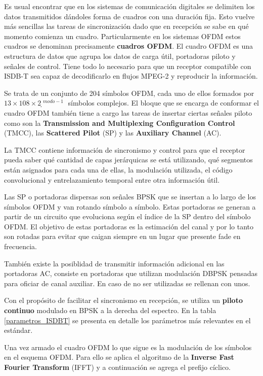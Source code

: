 \documentclass[journal,comsoc]{IEEEtran}
\begin{document}
Es usual encontrar que en los sistemas de comunicación digitales se delimiten los datos transmitidos dándoles forma de cuadros con una duración fija. Esto vuelve más sencillas las tareas de sincronización dado que en recepción se sabe en qué momento comienza un cuadro. Particularmente en los sistemas OFDM estos cuadros se denominan precisamente \textbf{cuadros OFDM}. El cuadro OFDM es una estructura de datos que agrupa los datos de carga útil, portadoras piloto y señales de control. Tiene todo lo necesario para que un receptor compatible con ISDB-T sea capaz de decodificarlo en flujos MPEG-2 y reproducir la información.

Se trata de un conjunto de 204 símbolos OFDM, cada uno de ellos formados por $13 \times 108 \times 2̣^{modo-1}$ símbolos complejos. El bloque que se encarga de conformar el cuadro OFDM también tiene a cargo las tareas de insertar ciertas señales piloto como son la \textbf{Transmission and Multiplexing Configuration Control} (TMCC), las \textbf{Scattered Pilot} (SP) y las \textbf{Auxiliary Channel} (AC).

La TMCC contiene información de sincronismo y control para que el receptor pueda saber qué cantidad de capas jerárquicas se está utilizando, qué segmentos están asignados para cada una de ellas, la modulación utilizada, el código convolucional y entrelazamiento temporal entre otra información útil. 

Las SP o portadoras dispersas son señales BPSK que se insertan a lo largo de los símbolos OFDM y van rotando símbolo a símbolo. Estas portadoras se generan a partir de un circuito que evoluciona según el índice de la SP dentro del símbolo OFDM. El objetivo de estas portadoras es la estimación del canal y por lo tanto son rotadas para evitar que caigan siempre en un lugar que presente fade en frecuencia.

También existe la posiblidad de transmitir información adicional en las portadoras AC, consiste en portadoras que utilizan modulación DBPSK pensadas para oficiar de canal auxiliar. En caso de no ser utilizadas se rellenan con unos.

Con el propósito de facilitar el sincronismo en recepción, se utiliza un \textbf{piloto continuo} modulado en BPSK a la derecha del espectro. En la tabla \ref{parametros_ISDBT} se presenta en detalle los parámetros más relevantes en el estándar.

Una vez armado el cuadro OFDM lo que sigue es la modulación de los símbolos en el esquema OFDM. Para ello se aplica el algoritmo de la \textbf{Inverse Fast Fourier Transform} (IFFT) y a continuación se agrega el prefijo cíclico.
\end{document}
